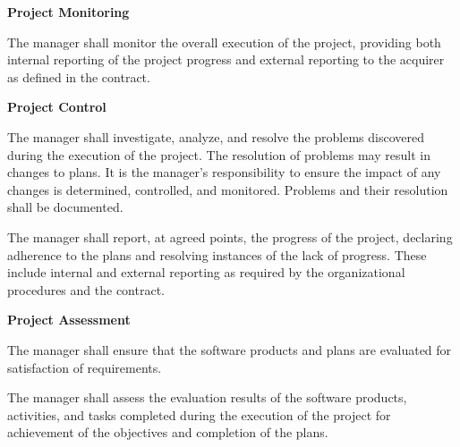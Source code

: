 			\begin{adjustwidth}{2em}{0pt} 

				\begin{compactenum}

					\item {\bf Project Monitoring}

					\begin{compactenum}

						\item The manager shall monitor the overall execution of the project, providing both internal reporting of the project progress and external reporting to the acquirer as defined in the contract.

					\end{compactenum}


					\item {\bf Project Control}

					\begin{compactenum}
						
						\item The manager shall investigate, analyze, and resolve the problems discovered during the execution of the project. The resolution of problems may result in changes to plans. It is the manager's responsibility to ensure the impact of any changes is determined, controlled, and monitored. Problems and their resolution shall be documented.

						\item The manager shall report, at agreed points, the progress of the project, declaring adherence to the plans and resolving instances of the lack of progress. These include internal and external reporting as required by the organizational procedures and the contract.

					\end{compactenum}

					\item {\bf Project Assessment}

					\begin{compactenum}

						\item The manager shall ensure that the software products and plans are evaluated for satisfaction of requirements.

						\item The manager shall assess the evaluation results of the software products, activities, and tasks completed during the execution of the project for achievement of the objectives and completion of the plans.


\end{compactenum}
\end{compactenum}
\end{adjustwidth}
